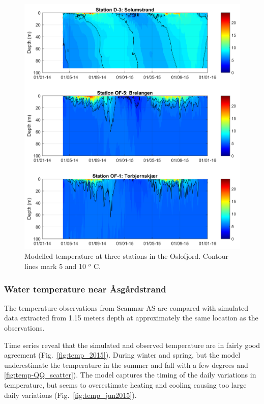 \begin{figure}[tbh]
\centerline{
\includegraphics*[trim=0cm 0cm 0cm 0cm,clip=true,width=\textwidth]{Figurer/Temp_Mod_2014_2015}}
\caption{\small
Modelled temperature at three stations in the Oslofjord. Contour lines mark 5 and 10 $^o$ C.
}
\label{fig:Temp_Mod_2014_2015}
\end{figure}


\clearpage 
\subsubsection{Water temperature near \AA sg\aa rdstrand}

The temperature observations from Scanmar AS are compared with simulated data extracted from 1.15 meters depth at approximately the same location as the observations.

Time series reveal that the simulated and observed temperature are in fairly good agreement (Fig.~\ref{fig:temp_2015}). During winter and spring, but the model underestimate the temperature in the summer and fall with a few degrees  and \ref{fig:temp-QQ_scatter}). The model captures the timing of the daily variations in temperature, but seems to overestimate heating and cooling causing too large daily variations (Fig.~\ref{fig:temp_jun2015}). 

